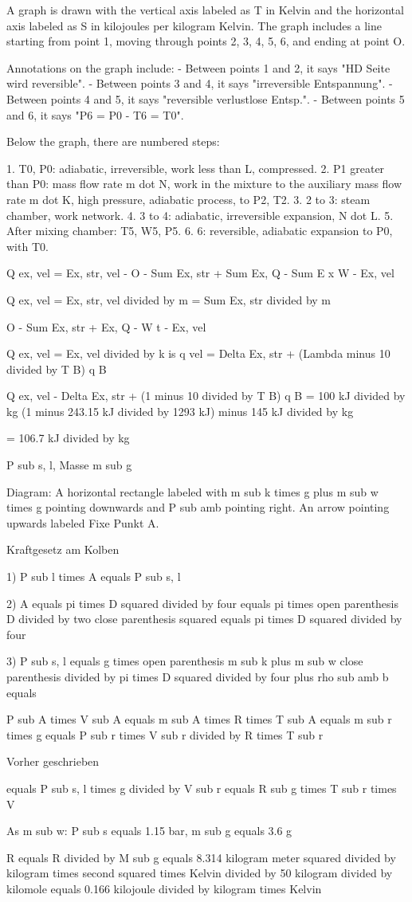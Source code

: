 A graph is drawn with the vertical axis labeled as T in Kelvin and the horizontal axis labeled as S in kilojoules per kilogram Kelvin. The graph includes a line starting from point 1, moving through points 2, 3, 4, 5, 6, and ending at point O. 

Annotations on the graph include:
- Between points 1 and 2, it says "HD Seite wird reversible".
- Between points 3 and 4, it says "irreversible Entspannung".
- Between points 4 and 5, it says "reversible verlustlose Entsp.".
- Between points 5 and 6, it says "P6 = P0 - T6 = T0".

Below the graph, there are numbered steps:

1. T0, P0: adiabatic, irreversible, work less than L, compressed.
2. P1 greater than P0: mass flow rate m dot N, work in the mixture to the auxiliary mass flow rate m dot K, high pressure, adiabatic process, to P2, T2.
3. 2 to 3: steam chamber, work network.
4. 3 to 4: adiabatic, irreversible expansion, N dot L.
5. After mixing chamber: T5, W5, P5.
6. 6: reversible, adiabatic expansion to P0, with T0.

Q ex, vel = Ex, str, vel - O - Sum Ex, str + Sum Ex, Q - Sum E x W - Ex, vel

Q ex, vel = Ex, str, vel divided by m = Sum Ex, str divided by m

O - Sum Ex, str + Ex, Q - W t - Ex, vel

Q ex, vel = Ex, vel divided by k is q vel = Delta Ex, str + (Lambda minus 10 divided by T B) q B

Q ex, vel - Delta Ex, str + (1 minus 10 divided by T B) q B = 100 kJ divided by kg (1 minus 243.15 kJ divided by 1293 kJ) minus 145 kJ divided by kg

= 106.7 kJ divided by kg

P sub s, l, Masse m sub g

Diagram: A horizontal rectangle labeled with m sub k times g plus m sub w times g pointing downwards and P sub amb pointing right. An arrow pointing upwards labeled Fixe Punkt A.

Kraftgesetz am Kolben

1) P sub l times A equals P sub s, l

2) A equals pi times D squared divided by four equals pi times open parenthesis D divided by two close parenthesis squared equals pi times D squared divided by four

3) P sub s, l equals g times open parenthesis m sub k plus m sub w close parenthesis divided by pi times D squared divided by four plus rho sub amb b equals 

P sub A times V sub A equals m sub A times R times T sub A equals m sub r times g equals P sub r times V sub r divided by R times T sub r

Vorher geschrieben

equals P sub s, l times g divided by V sub r equals R sub g times T sub r times V

As m sub w: P sub s equals 1.15 bar, m sub g equals 3.6 g

R equals R divided by M sub g equals 8.314 kilogram meter squared divided by kilogram times second squared times Kelvin divided by 50 kilogram divided by kilomole equals 0.166 kilojoule divided by kilogram times Kelvin
